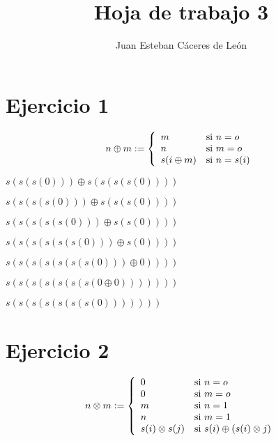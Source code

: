 \documentclass{article}
\title{Hoja de trabajo 3}
\author{Juan Esteban Cáceres de León }
\begin{document}
\maketitle

\section{Ejercicio 1}
\[
        n\oplus m := \left\{
        \begin{array}{l l}
            m & \mbox{si } n=o \\
            n & \mbox{si } m=o \\
            s(i\oplus m) & \mbox{si } n=s(i) \\
        \end{array}
        \right.
    \]
\begin{center}
    $s(s(s(0))) \oplus s(s(s(s(0))))$
    
\end{center}  
\begin{center}
    $s(s(s(s(0))) \oplus s(s(s(0))))$
    
\end{center}
\begin{center}
    $s(s(s(s(s(0))) \oplus s(s(0))))$
   
\end{center}
\begin{center}
    $s(s(s(s(s(s(0))) \oplus s(0))))$
    
\end{center}
\begin{center}
    $s(s(s(s(s(s(s(0))) \oplus 0))))$
   
\end{center}
\begin{center}
    $s(s(s(s(s(s(s(0 \oplus 0)))))))$
   
\end{center}
\begin{center}
    $s(s(s(s(s(s(s(0)))))))$
\end{center}
\section{Ejercicio 2}
\[
        n\otimes m := \left\{
        \begin{array}{l l}
            0 & \mbox{si } n=o \\
            0 & \mbox{si } m=o \\
            m & \mbox{si } n=1 \\
            n & \mbox{si } m=1 \\
            s(i)\otimes s(j) & \mbox{si } s(i) \oplus (s(i) \otimes j) \\
        \end{array}
        \right.
    \]
\end{document}
